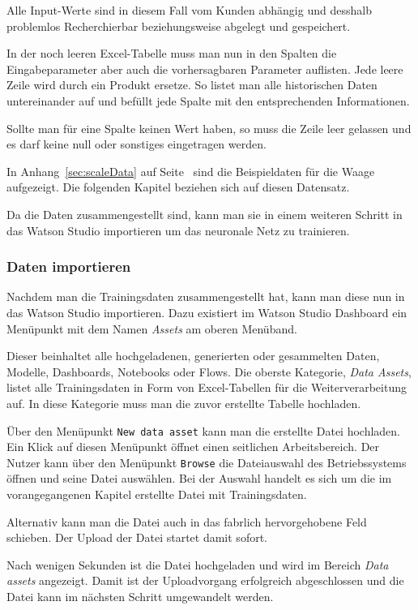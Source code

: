 Alle Input-Werte sind in diesem Fall vom Kunden abhängig und desshalb problemlos Recherchierbar beziehungsweise abgelegt
und gespeichert.

In der noch leeren Excel-Tabelle muss man nun in den Spalten die Eingabeparameter aber auch die vorhersagbaren Parameter
auflisten. Jede leere Zeile wird durch ein Produkt ersetze. So listet man alle historischen Daten untereinander auf und
befüllt jede Spalte mit den entsprechenden Informationen.

Sollte man für eine Spalte keinen Wert haben, so muss die Zeile leer gelassen und es darf keine null oder sonstiges
eingetragen werden.

In Anhang~\ref{sec:scaleData} auf Seite~\pageref{sec:scaleData} sind die Beispieldaten für die Waage aufgezeigt. Die
folgenden Kapitel beziehen sich auf diesen Datensatz.

Da die Daten zusammengestellt sind, kann man sie in einem weiteren Schritt in das Watson Studio importieren um das
neuronale Netz zu trainieren.

\subsubsection{Daten importieren}
Nachdem man die Trainingsdaten zusammengestellt hat, kann man diese nun in das Watson Studio importieren. Dazu existiert
im Watson Studio Dashboard ein Menüpunkt mit dem Namen \textit{Assets} am oberen Menüband.

Dieser beinhaltet alle hochgeladenen, generierten oder gesammelten Daten, Modelle, Dashboards, Notebooks oder Flows. Die
oberste Kategorie, \textit{Data Assets}, listet alle Trainingsdaten in Form von Excel-Tabellen für die Weiterverarbeitung
auf. In diese Kategorie muss man die zuvor erstellte Tabelle hochladen.

Über den Menüpunkt \texttt{New data asset} kann man die erstellte Datei hochladen. Ein Klick auf diesen Menüpunkt öffnet
einen seitlichen Arbeitsbereich. Der Nutzer kann über den Menüpunkt \texttt{Browse} die Dateiauswahl des Betriebssystems
öffnen und seine Datei auswählen. Bei der Auswahl handelt es sich um die im vorangegangenen Kapitel erstellte Datei mit
Trainingsdaten.

Alternativ kann man die Datei auch in das fabrlich hervorgehobene Feld schieben. Der Upload der Datei startet damit
sofort.

Nach wenigen Sekunden ist die Datei hochgeladen und wird im Bereich \textit{Data assets} angezeigt. Damit ist der
Uploadvorgang erfolgreich abgeschlossen und die Datei kann im nächsten Schritt umgewandelt werden.

